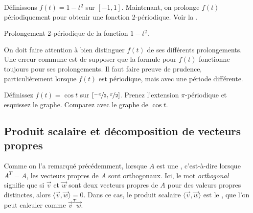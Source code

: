 \begin{example}
Définissons  $f(t) = 1-t^2$ sur $[-1,1]$.  Maintenant, on prolonge $f(t)$ périodiquement pour obtenir une fonction 2-périodique. Voir la .
\begin{myfig}
\capstart
{}
\caption{Prolongement 2-périodique de la fonction 
$1-t^2$.\label{ts:perextofinvertedparabolafig}}
\end{myfig}
\end{example}

On doit faire attention à bien distinguer $f(t)$ de ses différents prolongements.  Une erreur commune est de supposer que la formule pour $f(t)$ fonctionne toujours pour ses prolongements. Il faut faire preuve de prudence, particulièrement lorsque $f(t)$ est périodique, mais avec une période différente.

\begin{exercise}
Définissez $f(t) = \cos t$ sur $[\nicefrac{-\pi}{2},\nicefrac{\pi}{2}]$.  Prenez l'extension $\pi$-périodique et esquissez le graphe. Comparez avec le graphe de $\cos t$.
\end{exercise}

\subsection{Produit scalaire et décomposition de vecteurs propres }

Comme on l'a remarqué précédemment, lorsque $A$ est une \emph{},
c'est-à-dire lorsque $A^T = A$, les vecteurs propres de $A$ sont orthogonaux. Ici, le mot 
\emph{orthogonal} signifie que si $\vec{v}$ et $\vec{w}$ sont deux vecteurs propres de $A$ pour des valeurs propres distinctes, alors $\langle \vec{v} , \vec{w} \rangle = 0$.
Dans ce cas, le produit scalaire  $\langle \vec{v} , \vec{w} \rangle$
est le \emph{}, que l'on peut calculer comme $\vec{v}^T\vec{w}$.

